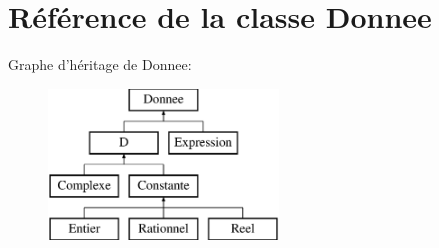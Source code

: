 \hypertarget{class_donnee}{\section{Référence de la classe Donnee}
\label{class_donnee}
}
Graphe d'héritage de Donnee\-:\begin{figure}[H]
\begin{center}
\leavevmode
\includegraphics[height=4.000000cm]{class_donnee}
\end{center}
\end{figure}
